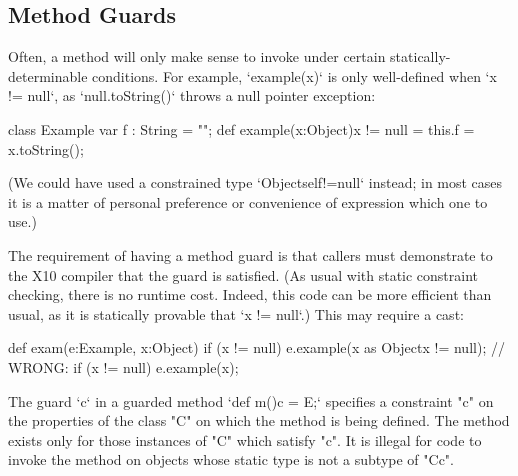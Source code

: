 \subsection{Method Guards}
\label{MethodGuard}

Often, a method will only make sense to invoke under certain
statically-determinable conditions.  For example, \xcd`example(x)` is only
well-defined when \xcd`x != null`, as \xcd`null.toString()` throws a null
pointer exception: 
\begin{xten}
class Example {
   var f : String = "";
   def example(x:Object){x != null} = {
      this.f = x.toString();
   }
}
\end{xten}
%
\noindent
(We could have used a constrained type \xcd`Object{self!=null}` instead; in
most cases it is a matter of personal preference or convenience of expression
which one to use.) 

The requirement of having a method guard is that callers must demonstrate to
the X10
compiler that the guard is satisfied.  (As usual with static constraint
checking, there is no runtime cost.  Indeed, this code can be more efficient
than usual, as it is statically provable that \xcd`x != null`.)
This may require a cast: 
\begin{xten}
  def exam(e:Example, x:Object) {
    if (x != null) 
       e.example(x as Object{x != null});
    // WRONG: if (x != null) e.example(x);
  }
\end{xten}

The guard \xcd`{c}` 
in a guarded method 
\xcd`def m(){c} = E;`
specifies a constraint \xcd"c" on the
properties of the class \xcd"C" on which the method is being defined. The
method exists only for those instances of \xcd"C" which satisfy \xcd"c".  It is
illegal for code to invoke the method on objects whose static type is
not a subtype of \xcd"C{c}".

